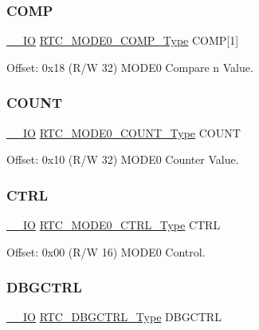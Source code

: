 \subsubsection{\texorpdfstring{COMP}{COMP}}
{\footnotesize\ttfamily \mbox{\hyperlink{core__cm0plus_8h_aec43007d9998a0a0e01faede4133d6be}{\+\_\+\+\_\+\+IO}} \mbox{\hyperlink{union_r_t_c___m_o_d_e0___c_o_m_p___type}{R\+T\+C\+\_\+\+M\+O\+D\+E0\+\_\+\+C\+O\+M\+P\+\_\+\+Type}} C\+O\+MP\mbox{[}1\mbox{]}}



Offset\+: 0x18 (R/W 32) M\+O\+D\+E0 Compare n Value. 

\mbox{\label{struct_rtc_mode0_aed00562f19cf1f8d99f3633048988f91}} 
\subsubsection{\texorpdfstring{COUNT}{COUNT}}
{\footnotesize\ttfamily \mbox{\hyperlink{core__cm0plus_8h_aec43007d9998a0a0e01faede4133d6be}{\+\_\+\+\_\+\+IO}} \mbox{\hyperlink{union_r_t_c___m_o_d_e0___c_o_u_n_t___type}{R\+T\+C\+\_\+\+M\+O\+D\+E0\+\_\+\+C\+O\+U\+N\+T\+\_\+\+Type}} C\+O\+U\+NT}



Offset\+: 0x10 (R/W 32) M\+O\+D\+E0 Counter Value. 

\mbox{\label{struct_rtc_mode0_a8bcd9282aa91de282d42bc3cbe47160b}} 
\subsubsection{\texorpdfstring{CTRL}{CTRL}}
{\footnotesize\ttfamily \mbox{\hyperlink{core__cm0plus_8h_aec43007d9998a0a0e01faede4133d6be}{\+\_\+\+\_\+\+IO}} \mbox{\hyperlink{union_r_t_c___m_o_d_e0___c_t_r_l___type}{R\+T\+C\+\_\+\+M\+O\+D\+E0\+\_\+\+C\+T\+R\+L\+\_\+\+Type}} C\+T\+RL}



Offset\+: 0x00 (R/W 16) M\+O\+D\+E0 Control. 

\mbox{\label{struct_rtc_mode0_a291f72f633a731e348a16601bc63a11a}} 
\subsubsection{\texorpdfstring{DBGCTRL}{DBGCTRL}}
{\footnotesize\ttfamily \mbox{\hyperlink{core__cm0plus_8h_aec43007d9998a0a0e01faede4133d6be}{\+\_\+\+\_\+\+IO}} \mbox{\hyperlink{union_r_t_c___d_b_g_c_t_r_l___type}{R\+T\+C\+\_\+\+D\+B\+G\+C\+T\+R\+L\+\_\+\+Type}} D\+B\+G\+C\+T\+RL}



